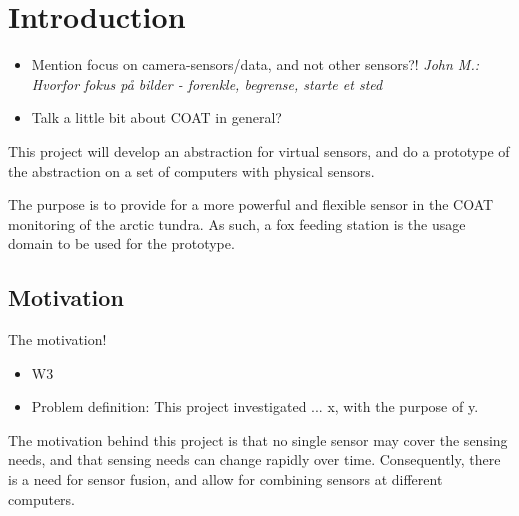 \documentclass[USenglish]{uit-thesis}
\begin{document}
\tableofcontents

\listoffigures

\mainmatter

\chapter{Introduction}
\begin{itemize}
\item Mention focus on camera-sensors/data, and not other sensors?!
\textit{John M.: Hvorfor fokus på bilder - forenkle, begrense, starte et sted}
\item Talk a little bit about COAT in general?
\end{itemize}

This project will develop an abstraction for virtual sensors, and do a prototype of the abstraction on a set of computers with physical sensors.

The purpose is to provide for a more powerful and flexible sensor in the COAT monitoring of the arctic tundra. As such, a fox feeding station is the usage domain to be used for the prototype.





\section{Motivation}
The motivation!
\begin{itemize}
\item W3
\item Problem definition: This project investigated ... x, with the purpose of y.
\end{itemize}

The motivation  behind this project is that no single sensor may cover the sensing needs, and that sensing needs can change rapidly over time. Consequently, there is a need for sensor fusion, and allow for combining sensors at different computers.
\end{document}
